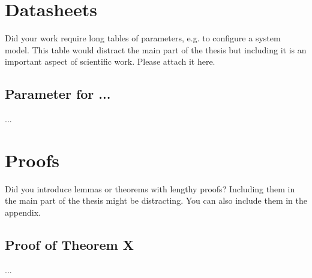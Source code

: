 \appendix


\chapter{Datasheets}

Did your work require long tables of parameters, e.g. to configure a system model. This table would distract the main part of the thesis but including it is an important aspect of scientific work. Please attach it here.

\section{Parameter for ...}
...

\chapter{Proofs}

Did you introduce  lemmas or theorems with lengthy proofs? Including them in the main part of the thesis might be distracting. You can also include them in the appendix.

\section{Proof of Theorem X}
...